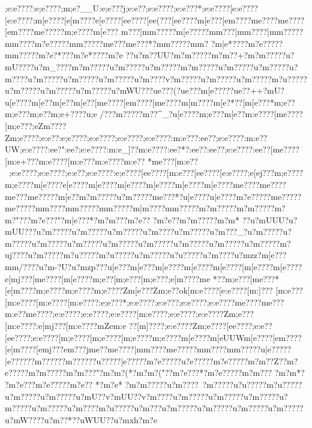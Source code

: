 {{{{{{{{{{{{{{{{{{{{{{{{{{{{{{{{{{{{{{{{{{{{{{{{{{{{{{{{{{{{{{{{{{{{{{{{{{{{{{{{{{{{{{{{{{{{{{{{{{{{{{{{{{{{{{{{{{{{{{{{{{{{{{{{{{{{{{{{{{{{{{{{{{{{{{{{{{{{{{{{{{{{{{{{{{{{{{{{{{{{{{{{{{{{{{{{{{{{{{{{{{{{{{{{{{{{{{{{{{{{{{{{{{{{{{{{{{{{{{{{{{{{{{{{{{{{{{{{{{{{{{{{{{{{{{;e:e????:e;e????;m;e?__U:e;e???j;e:e??;e:e????;e:e???*;e:e????[e:e????[e:e????;m[e????[e[m????{e[e????[e{e????[e{e(???[e{e????{m[e???[e{m????{m{e????{m{e????[e{m????{m{e?????m;e????{m[e???
{m\e*???|m{m?????m[e?????m{m???|m{m????|m{m?????m{m????{m?e?????m{m?????m{e???m{e???*?m{m?????m{m?
  ?m|e*????m?e?????m{m?????m?e?*???m?e*????m?e
??u?m??UU?m?m?????m?m??+?m?m?????u?mU????u?m_????m?m?????u?m?????u?m?????m?m?????u?m?????u?m?????u?m????u?m?????u?m?????u?m?????u?m????v?m?????u?m?????u?m?????m?u?????u?m?????u?m?????u?m?????u?mWU???u{e???(?u{e???m[e?????u{e??++?}{mU?u[e????{m[e??{m[e??{m[e??[m{e????[e{m????[m{e????{m[m????{m[e?*??[m[e???*{m;e??{m;e???{m;e??{m;e+????u;e
/???{m?????}{m??^_?u[e????{m;e ???{m[e ??{m:e????[me????[m;e???;eZm????Zm;e????;e:e??:e;e????;e:e????;e:e????;e:e????:m:e}???:ee??  ;e:e????:m:e??UW;e:e????:ee?" :ee?  ;e:e????:m:e_]??m:e????:ee?*? :ee?? :ee?? ;e:e????:ee?? [me????[m:e+???{m:e????[m:e ???{m:e????{m:e??
*{me???[m:e??~;e:e????;e:e????;e:e??;e:e????:e;e????[ee????[m:e???[ee????[e:e????;e[ej???{m;e????{m;e????{m[e????{e[e????{m[e????{m[e????{m[e????{m[e????{m[e????{m{e????{m{e????{m{e???{m{e?????m[e??{m?m?????u?m?????m{e???*?u|e????u|e????{m?e?????m{e?????m{e?????m{m????m{m?????m{m?????m|m????m{m?????m?m?????m?m?????m?m?"???m?e???"?m|e???*?m?m? ??m?e??
?m?e   ??m?m?????m?m*
??u?mUUU?u?mUU???u?m?????u?m?????u?m?????u?m????u?m?????u?m???_?u?m?????u?m?????u?m?????u?m?????u?m?????u?m?????u?m?????u?m?????u?m?????m?uj????u?m?????m?u?????m?u?????u?m?????u?u?????u?m????u?mzz?m[e??  ?m{m/????u?m -?U?u?mzp???u[e???{m[e??? {m[e????{m[e????{m[e????[m[e????{m[e????{e[mj???[m{e????[m[e????{m;e??[m;e???[m;e???;e[m????{me
*??{m;e???[m{e???*[e[m????{m;e????{m;e????{m;e????Zm[e???Zm;e??ok[m:e????[e:e????[m:]???
[m:e???[m:e????[m:e????[m:e????:e;e???*;e:e????;e:e???;e:e????;e:e????{me????{me???
{m:e?? {me????;e:e????;e:e????;e:e????[m:e????;e:e????;e:e????Zm;e???[m:e????:e[mj???[m:e????{mZe {m:e  ??[m]????;e:e????Zm;e????[ee????;e:e??[ee????;e:e????[m;e????[m;e????[m;e????{m;e????{m[e????{m[eUU}W{m[e????[e{m????[e[m????[e{mj???{e{m???j{m{e??{m{e????|m{m????{m{e?????m{m????m{m?????u|e?????}|e?????}?m?????}?m?????}?u?????}|e?????m?e?????u?e?????m?e?????m?m??Z??m?e?????m?m?????m?m???"?m?m?(*?m?m?("??m?e???*?m?e?????m?m??? ?m?m*?
 ?m?e  ???m?e?????m?e??
*?m?e*
 ?m?m?????u?m????~?m?????u?u?????m?u?????u?m?????u?m?????u?mU??v?mUU??v?m????u?m?????u?m?????u?m?????u?m?????u?m?????u?m????m?u?????u?m???u?m?????u?m?????u?m?????u?m?????u?mW????u?m??*?}?uWUU??u?mxh?m?e 
}}}}}}}}}}}}}}}}}}}}}}}}}}}}}}}}}}}}}}}}}}}}}}}}}}}}}}}}}}}}}}}}}}}}}}}}}}}}}}}}}}}}}}}}}}}}}}}}}}}}}}}}}}}}}}}}}}}}}}}}}}}}}}}}}}}}}}}}}}}}}}}}}}}}}}}}}}}}}}}}}}}}}}}}}}}}}}}}}}}}}}}}}}}}}}}}}}}}}}}}}}}}}}}}}}}}}}}}}}}}}}}}}}}}}}}}}}}}}}}}}}}}}}}}}}}}}}}}}}}}}}}}}}}}}}}}}}}}}}}}}}}}}}}}}}}}}}}}}}}}}}}}}}}}}}}}}}}}}}}}}}}}}}}}}}}}}}}}}}}}}}}}}}}}}}}}}}}}}}}}}}}}}}}}}}}}}}}}

